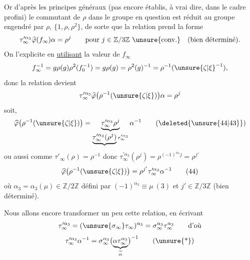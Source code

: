 

Or d'après les principes généraux (pas encore établis, à vrai dire, dans le cadre profini) le commutant de $\rho$ dans le groupe en question est réduit au groupe engendré par $\rho$, $\{1,\rho,\rho^2\}$, de sorte que la relation \unsure{(*)} prend la forme
\[
\tau_\infty^{\prime\alpha_3}\widehat{\varphi}(f_\infty)\alpha=\rho^j
\qquad\text{pour }j\in\mathbb Z/3\mathbb Z\ \unsure{\text{conv.}}
\quad\text{(bien déterminé)}.
\]
On l'explicite en \uline{utilisant} la valeur de $f_\infty$
\[
f_\infty^{-1}=g\rho(g)\rho^2(f_0^{-1})
=g\rho(g)=\rho^2(g)^{-1}=\rho^{-1}(\unsure{\zeta|\xi}^{-1}),
\]
donc la relation  devient
\[
\tau_\infty^{\prime\alpha_3}\widehat{\varphi}\bigl(\rho^{-1}(\unsure{\zeta|\xi})\bigr)\alpha=\rho^j
\]
soit, 
\[
\widehat{\varphi}\bigl(\rho^{-1}(\unsure{\zeta|\xi})\bigr)
=\underbrace{\tau_\infty^{\prime\alpha_3}\rho^j}_{\underbrace{\tau_\infty^{\prime\alpha_3}(\rho^j)}\tau_\infty^{\prime\alpha_3}}\alpha^{-1}
\tag{\deleted{\unsure{44|43}}}
\]
ou aussi
\deleted{\[
\widehat{\varphi}\bigl(\rho^{-1}(\unsure{\zeta|\xi}^{-1})\bigr)=\alpha\rho^{-j}\tau_\infty^{\prime\alpha_3}.
\tag{\unsure{44 bis|43 bis}}
\]}
comme $\tau'_\infty(\rho)=\rho^{-1}$ donc
$\tau_\infty^{\prime\alpha_3}(\rho^j)=\rho^{(-1)^{\alpha_3}j}=\rho^{j'}$
\[
\widehat{\varphi}\bigl(\rho^{-1}(\unsure{\zeta|\xi})\bigr)=\rho^{j'}\tau_\infty^{\prime\alpha_3}\alpha^{-1}
\tag{44}
\]
où $\alpha_3=\alpha_3(\mu)\in\mathbb Z/2\mathbb Z$ défini par $(-1)^{\alpha_3}\equiv\mu\ (3)$ et $j'\in\mathbb Z/3\mathbb Z$ (bien déterminé).

Nous allons encore transformer un peu cette relation, en écrivant
\[
\tau_\infty^{\prime\alpha_3}=(\unsure{\sigma_\infty}\tau_\infty)^{\alpha_3}=\sigma_\infty^{\alpha_3}\tau_\infty^{\alpha_3}
\qquad\text{d'où}
\]
\[
\tau_\infty^{\prime\alpha_3}\alpha^{-1}=\sigma_\infty^{\alpha_3}\bigl(\underbrace{\alpha\tau_\infty^{\alpha_3}}_{\widetilde\alpha}\bigr)^{-1}
\tag{\unsure{*}}
\]



